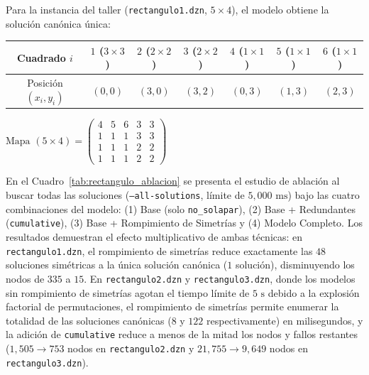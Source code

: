 Para la instancia del taller (\texttt{rectangulo1.dzn}, $5 \times 4$), el modelo obtiene la solución canónica única:
\begin{center}
\small
\begin{tabular}{ccccccc}
\toprule
Cuadrado $i$ & $1$ ($3\times 3$) & $2$ ($2\times 2$) & $3$ ($2\times 2$) & $4$ ($1\times 1$) & $5$ ($1\times 1$) & $6$ ($1\times 1$) \\
\midrule
Posición $(x_i, y_i)$ & $(0, 0)$ & $(3, 0)$ & $(3, 2)$ & $(0, 3)$ & $(1, 3)$ & $(2, 3)$ \\
\bottomrule
\end{tabular}
\qquad
$\text{Mapa } (5\times 4) = \begin{pmatrix}
4 & 5 & 6 & 3 & 3 \\
1 & 1 & 1 & 3 & 3 \\
1 & 1 & 1 & 2 & 2 \\
1 & 1 & 1 & 2 & 2
\end{pmatrix}$
\end{center}

En el Cuadro~\ref{tab:rectangulo_ablacion} se presenta el estudio de ablación al buscar todas las soluciones (\texttt{--all-solutions}, límite de $5{,}000\text{ ms}$) bajo las cuatro combinaciones del modelo: (1) Base (solo \texttt{no\_solapar}), (2) Base + Redundantes (\texttt{cumulative}), (3) Base + Rompimiento de Simetrías y (4) Modelo Completo. Los resultados demuestran el efecto multiplicativo de ambas técnicas: en \texttt{rectangulo1.dzn}, el rompimiento de simetrías reduce exactamente las $48$ soluciones simétricas a la única solución canónica ($1$ solución), disminuyendo los nodos de $335$ a $15$. En \texttt{rectangulo2.dzn} y \texttt{rectangulo3.dzn}, donde los modelos sin rompimiento de simetrías agotan el tiempo límite de $5\text{ s}$ debido a la explosión factorial de permutaciones, el rompimiento de simetrías permite enumerar la totalidad de las soluciones canónicas ($8$ y $122$ respectivamente) en milisegundos, y la adición de \texttt{cumulative} reduce a menos de la mitad los nodos y fallos restantes ($1{,}505 \to 753$ nodos en \texttt{rectangulo2.dzn} y $21{,}755 \to 9{,}649$ nodos en \texttt{rectangulo3.dzn}).

